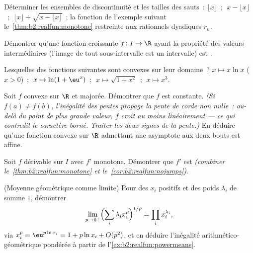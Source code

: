 \begin{exercise}[$\star$]\label{exo:b2:realfun:1}
Déterminer les ensembles de discontinuité et les tailles des sauts~:
$\lfloor x \rfloor$~; $\;x - \lfloor x\rfloor$~; $\;\lfloor x \rfloor
+ \sqrt{x - \lfloor x\rfloor}$~; la fonction de l'exemple suivant
le~\cref{thm:b2:realfun:monotone} restreinte aux rationnels dyadiques
$r_n$.
\end{exercise}

\begin{exercise}[$\star$]\label{exo:b2:realfun:2}
Démontrer qu'une fonction croissante $f \colon I \to \R$ ayant la
propriété des valeurs intermédiaires (l'image de tout sous-intervalle
est un intervalle) est .
\end{exercise}

\begin{exercise}[$\star$]\label{exo:b2:realfun:3}
Lesquelles des fonctions suivantes sont convexes sur leur domaine~?
$x \mapsto x\ln x$ ($x > 0$)~; $\;x \mapsto \ln(1 + \eu^x)$~; $\;x
\mapsto \sqrt{1 + x^2}$~; $\;x \mapsto x^3$.
\end{exercise}

\begin{exercise}[$\star\star$]\label{exo:b2:realfun:4}
Soit $f$ convexe sur $\R$ et majorée. Démontrer que $f$ est
constante. \emph{(Si $f(a) \neq f(b)$, l'inégalité des pentes propage
la pente de corde non nulle~: au-delà du point de plus grande valeur,
$f$ croît au moins linéairement --- ce qui contredit le caractère
borné. Traiter les deux signes de la pente.)} En déduire qu'une
fonction convexe sur $\R$ admettant une asymptote aux deux bouts est
affine.
\end{exercise}

\begin{exercise}[$\star\star$]\label{exo:b2:realfun:5}
Soit $f$ dérivable sur $I$ avec $f'$ monotone. Démontrer que $f'$ est
 \emph{(combiner le~\cref{thm:b2:realfun:monotone} et
le~\cref{cor:b2:realfun:nojumps})}.
\end{exercise}

\begin{exercise}[$\star\star$]\label{exo:b2:realfun:6}
(Moyenne géométrique comme limite) Pour des $x_i$ positifs et des
poids $\lambda_i$ de somme $1$, démontrer
\[
\lim_{p \to 0^+} \Bigl(\sum_i \lambda_i x_i^p\Bigr)^{1/p}
= \prod_i x_i^{\lambda_i} ,
\]
via $x_i^p = \eu^{p\ln x_i} = 1 + p\ln x_i + O(p^2)$, et en déduire
l'inégalité arithmético-géométrique pondérée à partir de
l'\cref{ex:b2:realfun:powermeans}.
\end{exercise}

